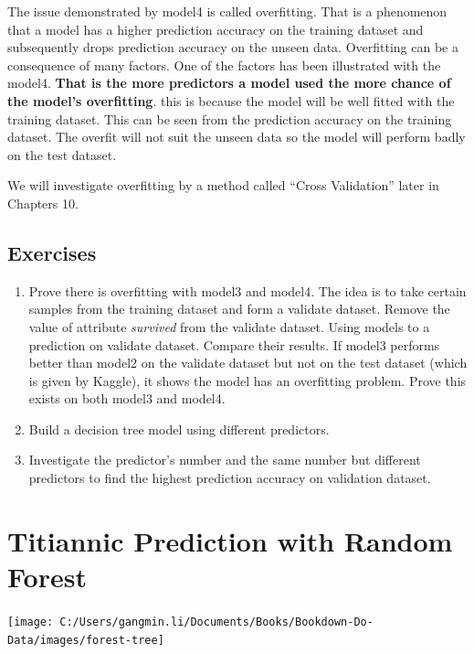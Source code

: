 \documentclass[
]{book}
\begin{document}
The issue demonstrated by model4 is called overfitting. That is a phenomenon that a model has a higher prediction accuracy on the training dataset and subsequently drops prediction accuracy on the unseen data. Overfitting can be a consequence of many factors. One of the factors has been illustrated with the model4. \textbf{That is the more predictors a model used the more chance of the model's overfitting}. this is because the model will be well fitted with the training dataset. This can be seen from the prediction accuracy on the training dataset. The overfit will not suit the unseen data so the model will perform badly on the test dataset.

We will investigate overfitting by a method called ``Cross Validation'' later in Chapters 10.

\hypertarget{exercises-5}{%
\section*{Exercises}\label{exercises-5}}


\begin{enumerate}
\def\labelenumi{\arabic{enumi}.}
\item
  Prove there is overfitting with model3 and model4. The idea is to take certain samples from the training dataset and form a validate dataset. Remove the value of attribute \emph{survived} from the validate dataset. Using models to a prediction on validate dataset. Compare their results. If model3 performs better than model2 on the validate dataset but not on the test dataset (which is given by Kaggle), it shows the model has an overfitting problem. Prove this exists on both model3 and model4.
\item
  Build a decision tree model using different predictors.
\item
  Investigate the predictor's number and the same number but different predictors to find the highest prediction accuracy on validation dataset.
\end{enumerate}

\hypertarget{titiannic-prediction-with-random-forest}{%
\chapter{Titiannic Prediction with Random Forest}\label{titiannic-prediction-with-random-forest}}

\begin{center}\texttt{[image: C:/Users/gangmin.li/Documents/Books/Bookdown-Do-Data/images/forest-tree]} \end{center}
\end{document}
